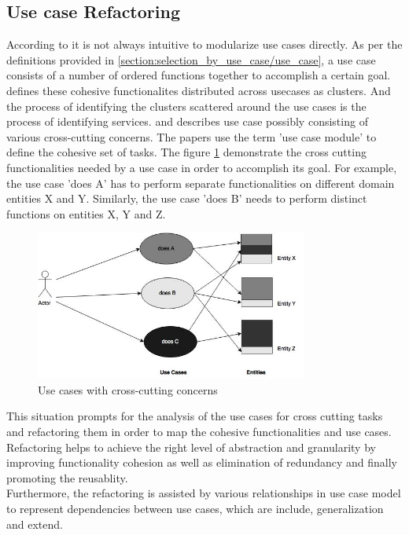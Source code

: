 \subsection{Use case Refactoring}\label{section:selection_by_use_case/use_case_refactoring}
According to \cite{Jacobson:1987aa} it is not always intuitive to modularize use cases directly. As per the definitions provided in \ref{section:selection_by_use_case/use_case}, a use case consists of a number of ordered functions together to accomplish a certain goal. \cite{Jacobson:1987aa} defines these cohesive functionalites distributed across usecases as clusters. And the process of identifying the clusters scattered around the use cases is the process of identifying services. \cite{Ng:2004aa} and \cite{Jacobson:2003aa} describes use case possibly consisting of various cross-cutting concerns. The papers use the term 'use case module' to define the cohesive set of tasks. The figure \ref{fig:selection_by_use_case/use_case_one} demonstrate the cross cutting functionalities needed by a use case in order to accomplish its goal. For example, the use case 'does A' has to perform separate functionalities on different domain entities X and Y. Similarly, the use case 'does B' needs to perform distinct functions on entities X, Y and Z.
\begin{figure}[H]
\begin{center}
\includegraphics[width=0.8\textwidth]{figures/use-case-one}
\caption{Use cases with cross-cutting concerns \cite{Ng:2004aa}}
\label{fig:selection_by_use_case/use_case_one}
\end{center}
\end{figure}
This situation prompts for the analysis of the use cases for cross cutting tasks and refactoring them in order to map the cohesive functionalities and use cases. Refactoring helps to achieve the right level of abstraction and granularity by improving functionality cohesion as well as elimination of redundancy and finally promoting the reusablity. \cite{Doh:2007aa}
\\
Furthermore, the refactoring is assisted by various relationships in use case model to represent dependencies between use cases, which are include, generalization and extend. \cite{Ng:2004aa}
\\
